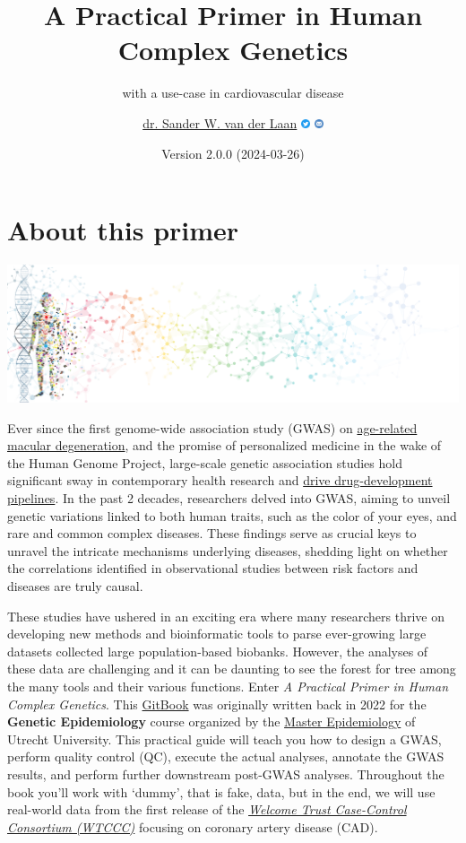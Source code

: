 \documentclass[
]{book}
\title{A Practical Primer in Human Complex Genetics}
\subtitle{with a use-case in cardiovascular disease}
\author{\href{https://vanderlaanand.science}{dr. Sander W. van der Laan} \href{https://www.twitter.com/swvanderlaan}{\includegraphics[width=0.02\textwidth,height=\textheight]{img/_logo/twitter_circle_blue.png}} \href{mailto:s.w.vanderlaan@gmail.com}{\includegraphics[width=0.02\textwidth,height=\textheight]{img/_logo/email_circle_blue.png}}}
\date{Version 2.0.0 (2024-03-26)}
\begin{document}
\maketitle

{
\setcounter{tocdepth}{1}
\tableofcontents
}
\hypertarget{about-this-primer}{%
\chapter{About this primer}\label{about-this-primer}}

\includegraphics[width=1\textwidth,height=\textheight]{img/_headers/banner_man_standing_dna.png}

Ever since the first genome-wide association study (GWAS) on \href{https://doi.org/10.1126/science.1109557}{age-related macular degeneration}, and the promise of personalized medicine in the wake of the Human Genome Project, large-scale genetic association studies hold significant sway in contemporary health research and \href{http://dx.doi.org/10.1038/nrd.2017.262}{drive drug-development pipelines}. In the past 2 decades, researchers delved into GWAS, aiming to unveil genetic variations linked to both human traits, such as the color of your eyes, and rare and common complex diseases. These findings serve as crucial keys to unravel the intricate mechanisms underlying diseases, shedding light on whether the correlations identified in observational studies between risk factors and diseases are truly causal.

These studies have ushered in an exciting era where many researchers thrive on developing new methods and bioinformatic tools to parse ever-growing large datasets collected large population-based biobanks. However, the analyses of these data are challenging and it can be daunting to see the forest for tree among the many tools and their various functions. Enter \emph{A Practical Primer in Human Complex Genetics}. This \href{https://cjvanlissa.github.io/gitbook-demo/}{GitBook} was originally written back in 2022 for the \textbf{Genetic Epidemiology} course organized by the \href{https://epidemiology-education.nl}{Master Epidemiology} of Utrecht University. This practical guide will teach you how to design a GWAS, perform quality control (QC), execute the actual analyses, annotate the GWAS results, and perform further downstream post-GWAS analyses. Throughout the book you'll work with `dummy', that is fake, data, but in the end, we will use real-world data from the first release of the \href{https://www.wtccc.org.uk/ccc1/overview.html}{\emph{Welcome Trust Case-Control Consortium (WTCCC)}} focusing on coronary artery disease (CAD).
\end{document}
